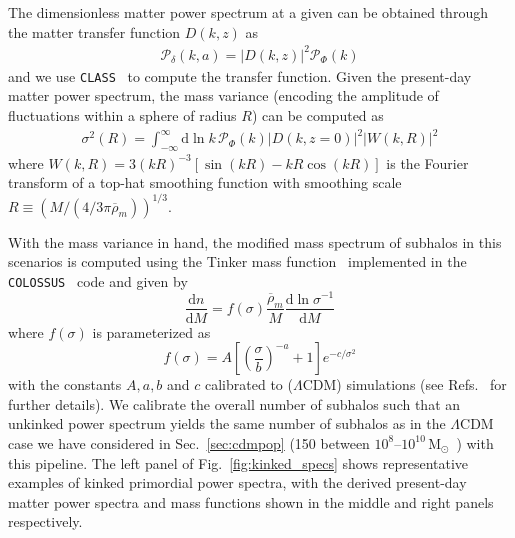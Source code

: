 \documentclass[prd,aps,10pt,nofootinbib,twocolumn,superscriptaddress,preprintnumbers,balancelastpage,longbibliography]{revtex4-1}
\newcommand{\dd}{\mathrm{d}}
\begin{document}
The dimensionless matter power spectrum at a given can be obtained through the matter transfer function $D(k,z)$ as
\begin{align}
\mathcal{P}_{\delta}(k,a) = \left|D\left(k,z\right)\right|^2 \mathcal{P}_{\Phi}(k) 
\end{align}
and we use \texttt{CLASS}~\cite{Blas:2011rf} to compute the transfer function. Given the present-day matter power spectrum, the mass variance (encoding the amplitude of fluctuations within a sphere of radius $R$) can be computed as 
\begin{align}
\sigma^2(R) = \int_{-\infty}^{\infty} \dd \ln k \, \mathcal{P}_{\Phi}(k) \left|D\left(k,z=0\right)\right|^2  \left| W(k,R) \right|^2
\end{align}
where  $W(k,R) = 3 (kR)^{-3}[\sin(kR)-kR\cos(kR)]$ is the Fourier transform of a top-hat smoothing function with smoothing scale $R\equiv (M / (4/3\pi\overline{\rho}_{m}))^{1/3}$.

With the mass variance in hand, the modified mass spectrum of subhalos in this scenarios is computed using the Tinker mass function~\cite{2008ApJ...688..709T} implemented in the \texttt{COLOSSUS}~\cite{2018ApJS..239...35D} code and given by
\begin{equation}
\frac{\dd n}{\dd M}=f(\sigma) \frac{\overline{\rho}_{m}}{M} \frac{\dd \ln \sigma^{-1}}{\dd M}
\end{equation}
where $f(\sigma)$ is parameterized as
\begin{equation}
f(\sigma)=A\left[\left(\frac{\sigma}{b}\right)^{-a}+1\right] e^{-c / \sigma^{2}}
\end{equation}
with the constants $A, a, b$ and $c$ calibrated to ($\Lambda$CDM) simulations (see Refs.~\cite{2008ApJ...688..709T,2018ApJS..239...35D} for further details). We calibrate the overall number of subhalos such that an unkinked power spectrum yields the same number of subhalos as in the $\Lambda$CDM case we have considered in Sec.~\ref{sec:cdmpop} (150 between $10^8$--$10^{10}$\,M$_\odot$~\cite{Hutten:2016jko}) with this pipeline. The left panel of Fig.~\ref{fig:kinked_specs} shows representative examples of kinked primordial power spectra, with the derived present-day matter power spectra and mass functions shown in the middle and right panels respectively.
\end{document}
